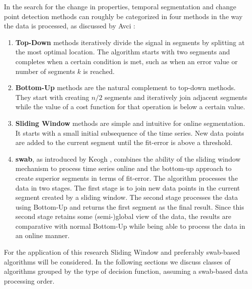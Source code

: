 In the search for the change in properties, temporal segmentation and change point detection methods can roughly be categorized in four methods in the way the data is processed, as discussed by Avci \etal \cite{avci2010activity}:
\begin{enumerate}
  \item \textbf{Top-Down} methods iteratively divide the signal in segments by splitting at the most optimal location.
  The algorithm starts with two segments and completes when a certain condition is met, such as when an error value or number of segments $k$ is reached.
  \item \textbf{Bottom-Up} methods are the natural complement to top-down methods.
  They start with creating $n/2$ segments and iteratively join adjacent segments while the value of a cost function for that operation is below a certain value.
  \item \textbf{Sliding Window} methods are simple and intuitive for online segmentation.
  It starts with a small initial subsequence of the time series.
  New data points are added to the current segment until the fit-error is above a threshold.
  \item \textbf{\acrlong{swab}}, as introduced by Keogh \etal \cite{keogh2001online}, combines the ability of the sliding window mechanism to process time series online and the bottom-up approach to create superior segments in terms of fit-error.
  The algorithm processes the data in two stages.
  The first stage is to join new data points in the current segment created by a sliding window.
  The second stage processes the data using Bottom-Up and returns the first segment as the final result.
  Since this second stage retains some (semi-)global view of the data, the results are comparative with normal Bottom-Up while being able to process the data in an online manner.
\end{enumerate}
For the application of this research Sliding Window and preferably \gls{swab}-based algorithms will be considered.
In the following sections we discuss classes of algorithms grouped by the type of decision function, assuming a \gls{swab}-based data processing order.

